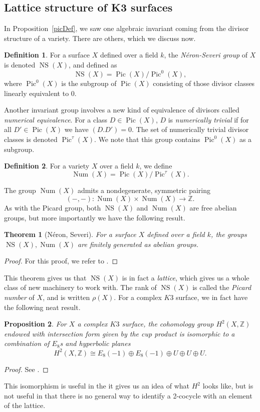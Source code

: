 \documentclass[12pt,twoside]{reedthesis}
\theoremstyle{plain}
\newtheorem{theorem}{Theorem}[chapter]
\newtheorem{proposition}[theorem]{Proposition}
\theoremstyle{definition}
\newtheorem{definition}{Definition}[section]
\theoremstyle{remark}
\newcommand{\ZZ}{\mathbb{Z}}
\newcommand{\Pic}{\operatorname{Pic}}
\newcommand{\NS}{\operatorname{NS}}
\newcommand{\Num}{\operatorname{Num}}
\begin{document}
\subsection{Lattice structure of K3 surfaces}
In Proposition~\ref{picDef}, we saw one algebraic invariant coming from the divisor structure of a variety. There are others, which we discuss now.
\begin{definition}
For a surface $X$ defined over a field $k$, the \emph{N\'eron-Severi group} of $X$ is denoted $\NS(X)$, and defined as \[\NS(X)=\Pic(X)/\Pic^0(X),\] where $\Pic^0(X)$ is the subgroup of $\Pic(X)$ consisting of those divisor classes linearly equivalent to 0.
\end{definition}
\noindent Another invariant group involves a new kind of equivalence of divisors called \emph{numerical equivalence}. For a class $D\in\Pic(X)$, $D$ is \emph{numerically trivial} if for all $D'\in\Pic(X)$ we have $(D.D')=0$. The set of numerically trivial divisor classes is denoted $\Pic^\tau(X)$. We note that this group contains $\Pic^0(X)$ as a subgroup.
\begin{definition}
For a variety $X$ over a field $k$, we define \[\Num(X)=\Pic(X)/\Pic^\tau(X).\]
\end{definition}
\noindent The group $\Num(X)$ admits a nondegenerate, symmetric pairing
\[
(-,-):\Num(X)\times\Num(X)\to\ZZ.
\]
As with the Picard group, both $\NS(X)$ and $\Num(X)$ are free abelian groups, but more importantly we have the following result.
\begin{theorem}[N\'eron, Severi] For a surface $X$ defined over a field $k$, the groups $\NS(X),\Num(X)$ are finitely generated as abelian groups.
\end{theorem}
\begin{proof}
For this proof, we refer to \cite[Theorem 3.25]{milneET}.
\end{proof}
\noindent This theorem gives us that $\NS(X)$ is in fact a \emph{lattice}, which gives us a whole class of new machinery to work with. The rank of $\NS(X)$ is called the \emph{Picard number} of $X$, and is written $\rho(X)$.
For a complex $K3$ surface, we in fact have the following neat result.
\begin{proposition}
For $X$ a complex $K3$ surface, the cohomology group $H^2(X,\ZZ)$ endowed with intersection form given by the cup product is isomorphic to a combination of $E_8$s and hyperbolic planes
\[
H^2(X,\ZZ)\cong E_8(-1)\oplus E_8(-1)\oplus U\oplus U\oplus U.
\]
\end{proposition}
\begin{proof}
See \cite[Proposition 1.3.5]{huybrechts}.
\end{proof}
\noindent This isomorphism is useful in the it gives us an idea of what $H^2$ looks like, but is not useful in that there is no general way to identify a 2-cocycle with an element of the lattice.
\end{document}

